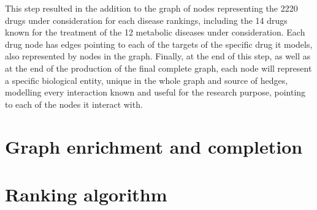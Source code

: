 This step resulted in the addition to the graph of nodes representing the 2220 drugs under consideration for each disease rankings, including the 14 drugs known for the treatment of the 12 metabolic diseases under consideration.
Each drug node has edges pointing to each of the targets of the specific drug it models, also represented by nodes in the graph. Finally, at the end of this step, as well as at the end of the production of the final complete graph, each node will represent a specific biological entity, unique in the whole graph and source of hedges, modelling every interaction known and useful for the research purpose, pointing to each of the nodes it interact with.

\section{Graph enrichment and completion}
\section{Ranking algorithm}
